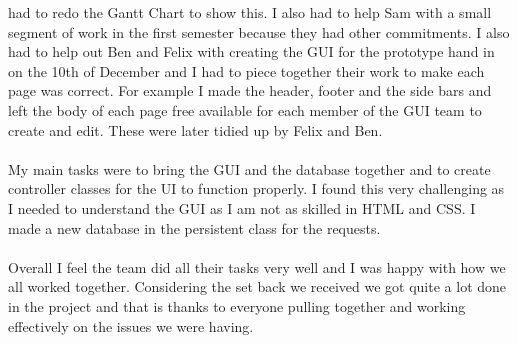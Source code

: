 \documentclass[titlepage]{article}
\begin{document}
{{{had to redo the Gantt Chart to show this. I also had to help Sam with a small segment of work in the
first semester because they had other commitments. I also had to help out Ben and Felix with
creating the GUI for the prototype hand in on the 10th of December and I had to piece
together their work to make each page was correct. For example I made the header, footer and the side bars
and left the body of each page free available for each member of the GUI team to create and edit. These
were later tidied up by Felix and Ben.
\\
\\
My main tasks were to bring the GUI and the database together and to create controller
classes for the UI to function properly. I found this very challenging as I needed to understand
the GUI as I am not as skilled in HTML and CSS.  I made a new database in the
persistent class for the requests.
\\
\\
Overall I feel the team did all their tasks very well and I was happy with how we all worked
together. Considering the set back we received we got quite a lot done in the project and that is thanks to
everyone pulling together and working effectively on the issues we were having.
}}}
\end{document}
